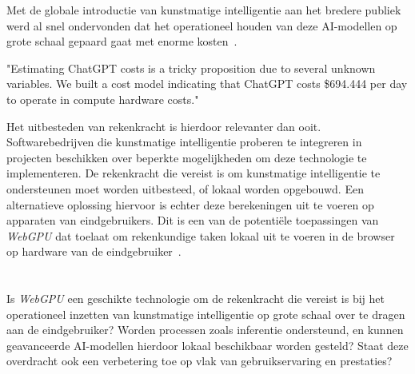 Met de globale introductie van kunstmatige intelligentie aan het bredere publiek werd al snel ondervonden dat het operationeel houden van deze AI-modellen op grote schaal gepaard gaat met enorme kosten~\autocite{Patel2023}.

\begin{displayquote}
    "Estimating ChatGPT costs is a tricky proposition due to several unknown variables. We built a cost model indicating that ChatGPT costs \$694.444 per day to operate in compute hardware costs."
\end{displayquote}

Het uitbesteden van rekenkracht is hierdoor relevanter dan ooit. Softwarebedrijven die kunstmatige intelligentie proberen te integreren in projecten beschikken over beperkte mogelijkheden om deze technologie te implementeren. De rekenkracht die vereist is om kunstmatige intelligentie te ondersteunen moet worden uitbesteed, of lokaal worden opgebouwd. Een alternatieve oplossing hiervoor is echter deze berekeningen uit te voeren op apparaten van eindgebruikers. Dit is een van de potentiële toepassingen van \textit{WebGPU} dat toelaat om rekenkundige taken lokaal uit te voeren in de browser op hardware van de eindgebruiker~\autocite{Wallez2023}.

\bigbreak{}

\section{}%
\label{sec:onderzoeksvraag}


Is \textit{WebGPU} een geschikte technologie om de rekenkracht die vereist is bij het operationeel inzetten van kunstmatige intelligentie op grote schaal over te dragen aan de eindgebruiker? Worden processen zoals inferentie ondersteund, en kunnen geavanceerde AI-modellen hierdoor lokaal beschikbaar worden gesteld? Staat deze overdracht ook een verbetering toe op vlak van gebruikservaring en prestaties?

